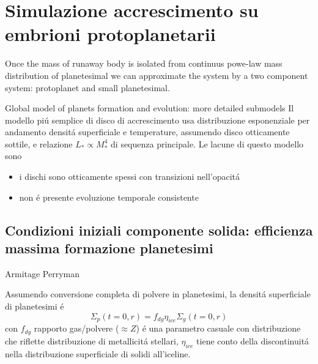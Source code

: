 {\let\clearpage\relax\let\cleardoublepage\relax
	\chapter{Simulazione accrescimento su embrioni protoplanetarii}
}

\begin{workout}
Once the mass of runaway body is isolated from continuus powe-law mass distribution of planetesimal we can approximate the system by a two component system: protoplanet and small planetesimal.
\end{workout}

\begin{workout}
	Global model of planets formation and evolution: more detailed submodels
	Il modello pi\'u semplice di disco di accrescimento usa distribuzione esponenziale per andamento densit\'a superficiale e temperature, assumendo disco otticamente sottile, e relazione $L_*\propto M_*^4$ di sequenza principale. Le lacune di questo modello sono
	\begin{itemize}
		\item i dischi sono otticamente spessi con transizioni nell'opacit\'a
		\item non \'e presente evoluzione temporale consistente
	\end{itemize}
\end{workout}

\section{Condizioni iniziali componente solida: efficienza massima formazione planetesimi}

\begin{workout}
Armitage
Perryman
\end{workout}

Assumendo conversione completa di polvere in planetesimi, la densit\'a superficiale di planetesimi \'e
\begin{equation}
\Sigma_p(t=0,r)=f_{dg}\eta_{ice}\Sigma_g(t=0,r)
\end{equation}
con $f_{dg}$ rapporto gas/polvere ($\approx Z$) \'e una parametro casuale con distribuzione che riflette distribuzione di metallicit\'a stellari, $\eta_{ice}$ tiene conto della discontinuit\'a nella distribuzione superficiale di solidi all'iceline.

